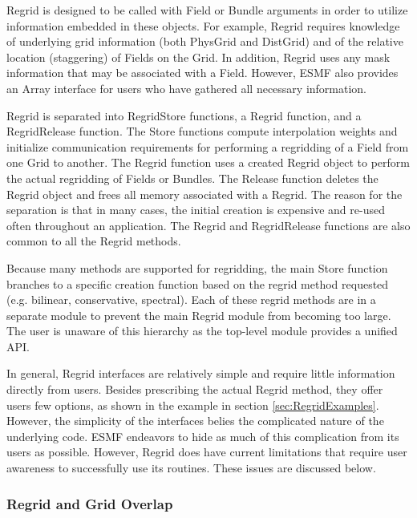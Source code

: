 

Regrid is designed to be called with Field or Bundle
arguments in order to utilize information embedded in
these objects.  For example, Regrid requires knowledge
of underlying grid information (both PhysGrid and DistGrid)
and of the relative location (staggering) of Fields on
the Grid.  In addition, Regrid uses any mask information
that may be associated with a Field.  However, ESMF also
provides an Array interface for users who have gathered all
necessary information.

Regrid is separated into RegridStore functions, a Regrid
function, and a RegridRelease function. The Store functions
compute interpolation weights and initialize communication
requirements for performing a regridding of a Field
from one Grid to another.  The Regrid function uses
a created Regrid object to perform the actual regridding
of Fields or Bundles.  The Release function deletes the
Regrid object and frees all memory associated with a Regrid.
The reason for the separation is that in many cases, the
initial creation is expensive and re-used often throughout
an application.  The Regrid and RegridRelease functions are
also common to all the Regrid methods.

Because many methods are supported for regridding,
the main Store function branches to a specific
creation function based on the regrid method requested
(e.g. bilinear, conservative, spectral).  Each of
these regrid methods are in a separate module to
prevent the main Regrid module from becoming too
large.  The user is unaware of this hierarchy as the
top-level module provides a unified API.

In general, Regrid interfaces are relatively simple and require little
information directly from users.  Besides prescribing the actual Regrid method,
they offer users few options, as shown in the example in section
\ref{sec:RegridExamples}.  However, the simplicity of the interfaces belies the
complicated nature of the underlying code.  ESMF endeavors to hide as much
of this complication from its users as possible.  However, Regrid does have
current limitations that require user awareness to successfully use its
routines.  These issues are discussed below.

\subsubsection{Regrid and Grid Overlap}

